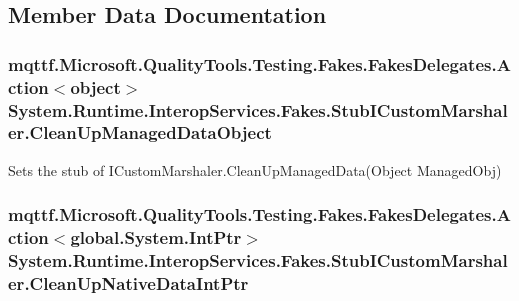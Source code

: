 \subsection{Member Data Documentation}
\hypertarget{class_system_1_1_runtime_1_1_interop_services_1_1_fakes_1_1_stub_i_custom_marshaler_a1392261f9f891ab870d785a8a63b0648}{
\subsubsection[{Clean\-Up\-Managed\-Data\-Object}]{\setlength{\rightskip}{0pt plus 5cm}mqttf.\-Microsoft.\-Quality\-Tools.\-Testing.\-Fakes.\-Fakes\-Delegates.\-Action$<$object$>$ System.\-Runtime.\-Interop\-Services.\-Fakes.\-Stub\-I\-Custom\-Marshaler.\-Clean\-Up\-Managed\-Data\-Object}}\label{class_system_1_1_runtime_1_1_interop_services_1_1_fakes_1_1_stub_i_custom_marshaler_a1392261f9f891ab870d785a8a63b0648}


Sets the stub of I\-Custom\-Marshaler.\-Clean\-Up\-Managed\-Data(\-Object Managed\-Obj)

\hypertarget{class_system_1_1_runtime_1_1_interop_services_1_1_fakes_1_1_stub_i_custom_marshaler_ad7d7d9d426391adfad9b289a4a6b7569}{
\subsubsection[{Clean\-Up\-Native\-Data\-Int\-Ptr}]{\setlength{\rightskip}{0pt plus 5cm}mqttf.\-Microsoft.\-Quality\-Tools.\-Testing.\-Fakes.\-Fakes\-Delegates.\-Action$<$global.\-System.\-Int\-Ptr$>$ System.\-Runtime.\-Interop\-Services.\-Fakes.\-Stub\-I\-Custom\-Marshaler.\-Clean\-Up\-Native\-Data\-Int\-Ptr}}\label{class_system_1_1_runtime_1_1_interop_services_1_1_fakes_1_1_stub_i_custom_marshaler_ad7d7d9d426391adfad9b289a4a6b7569}


